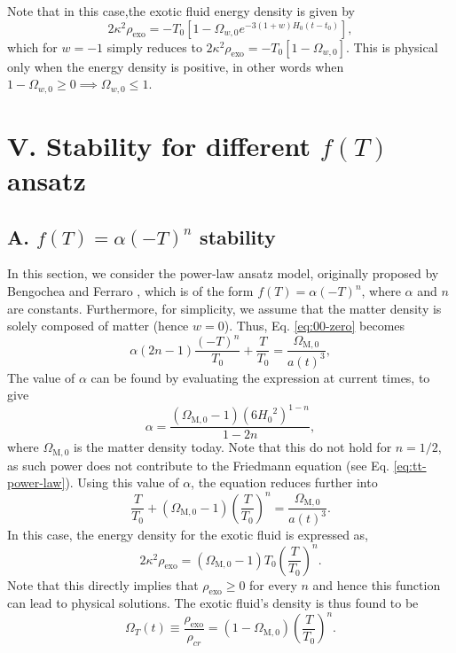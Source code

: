 \documentclass[prl,floatfix,showpacs,twocolumn,preprintnumbers,amsmath,amssymb,superscriptaddress]{revtex4}
\begin{document}
Note that in this case,the exotic fluid energy density is given by
\begin{equation}\label{eq:rhoDE_de-Sitter}
2\kappa^2 \rho_{\text{exo}} = -T_0\left[1- \Omega_{w,0} e^{-3(1+w)H_0 \left(t-t_0\right)}\right],
\end{equation}
which for $w = -1$ simply reduces to $2\kappa^2 \rho_{\text{exo}} = -T_0\left[1- \Omega_{w,0}\right]$. This is physical only when the energy density is positive, in other words when $1- \Omega_{w,0} \geq 0 \implies \Omega_{w,0} \leq 1$.

\section{V. Stability for different $f(T)$ ansatz}

\subsection{A. $f(T) = \alpha (-T)^n$ stability}

In this section, we consider the power-law ansatz model, originally proposed by Bengochea and Ferraro \cite{Bengochea:2008gz}, which is of the form $f(T) = \alpha (-T)^n$, where $\alpha$ and $n$ are constants. Furthermore, for simplicity, we assume that the matter density is solely composed of matter (hence $w = 0$). Thus, Eq. \eqref{eq:00-zero} becomes
\begin{equation}\label{eq:tt-power-law}
\alpha (2n-1) \dfrac{(-T)^n}{T_0}+\dfrac{T}{T_0}= \dfrac{\Omega_{\text{M},0}}{a(t)^3},
\end{equation}
The value of $\alpha$ can be found by evaluating the expression at current times, to give
\begin{equation}
\alpha = \dfrac{(\Omega_{\text{M},0}-1) \left(6 {H_0}^2\right)^{1-n}}{1-2 n},
\end{equation}
where $\Omega_{\text{M},0}$ is the matter density today. Note that this do not hold for $n = 1/2$, as such power does not contribute to the Friedmann equation (see Eq. \eqref{eq:tt-power-law}). Using this value of $\alpha$, the equation reduces further into
\begin{equation}
\dfrac{T}{T_0}+(\Omega_{\text{M},0}-1) \left(\dfrac{T}{T_0}\right)^{n}=\dfrac{\Omega_{\text{M},0}}{a(t)^3}.
\end{equation}
In this case, the energy density for the exotic fluid is expressed as,
\begin{equation}
2\kappa^2 \rho_{\text{exo}} = (\Omega_{\text{M},0}-1) T_0 \left(\dfrac{T}{T_0}\right)^n.
\end{equation}
Note that this directly implies that $\rho_{\text{exo}} \geq 0$ for every $n$ and hence this function can lead to physical solutions. The exotic fluid's density is thus found to be
\begin{equation}
\Omega_T (t) \equiv \dfrac{\rho_{\text{exo}}}{\rho_{cr}} = (1-\Omega_{\text{M},0}) \left(\dfrac{T}{T_0}\right)^n.
\end{equation}
\end{document}
